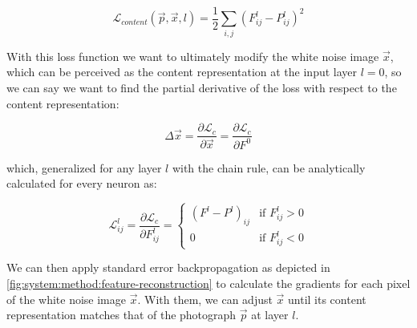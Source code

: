 \begin{equation}
  \mathcal{L}_{content}(\vec{p}, \vec{x}, l) = \frac{1}{2} \sum_{i,j}(F^l_{ij}-P^l_{ij})^2
\end{equation}

With this loss function we want to ultimately modify the white noise image $\vec{x}$, which can be perceived as the content representation at the input layer $l = 0$, so we can say we want to find the partial derivative of the loss with respect to the content representation:

\begin{equation}
  \Delta \vec{x} =
  \frac{\partial \mathcal{L}_{c}}{\partial \vec{x}} =
  \frac{\partial \mathcal{L}_{c}}{\partial F^0}
\end{equation}

which, generalized for any layer $l$ with the chain rule, can be analytically calculated for every neuron as:

\begin{equation}
  \mathcal{L}^l_{ij} =
  \frac{\partial \mathcal{L}_{c}}{\partial F^l_{ij}} =
  \begin{cases}
    (F^l - P^l)_{ij} & \text{if } F^l_{ij} > 0 \\
    0                & \text{if } F^l_{ij} < 0
  \end{cases}
\end{equation}

We can then apply standard error backpropagation \cite{Orr2008} as depicted in \autoref{fig:system:method:feature-reconstruction} to calculate the gradients for each pixel of the white noise image $\vec{x}$.
With them, we can adjust $\vec{x}$ until its content representation matches that of the photograph $\vec{p}$ at layer $l$.

